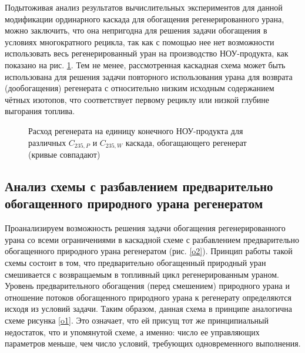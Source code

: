 Подытоживая анализ результатов вычислительных экспериментов для данной модификации ординарного каскада для обогащения регенерированного урана, можно заключить, что она непригодна для решения задачи обогащения в условиях многократного рецикла, так как с помощью нее нет возможности использовать весь регенерированный уран на производство НОУ-продукта, как показано на рис. \ref{Figure_10}. Тем не менее, рассмотренная каскадная схема может быть использована для решения задачи повторного использования урана для возврата (дообогащения) регенерата с относительно низким исходным содержанием чётных изотопов, что соответствует первому рециклу или низкой глубине выгорания топлива.


\begin{figure}[ht]
  \caption{Расход регенерата на единицу конечного НОУ-продукта для различных  $C_{235, P}$ и $C_{235, W}$ каскада, обогащающего регенерат (кривые совпадают)}\label{Figure_10}
\end{figure}

\subsection{Анализ схемы с разбавлением предварительно обогащенного природного урана регенератом}

Проанализируем возможность решения задачи обогащения регенерированного урана со всеми ограничениями в каскадной схеме с разбавлением предварительно обогащенного природного урана регенератом (рис. \ref{o2}). Принцип работы такой схемы состоит в том, что предварительно обогащенный природный уран смешивается с возвращаемым в топливный цикл регенерированным ураном. Уровень предварительного обогащения (перед смешением) природного урана и отношение потоков обогащенного природного урана к регенерату определяются исходя из условий задачи. Таким образом, данная схема в принципе аналогична схеме рисунка \ref{o1}. Это означает, что ей присущ тот же принципиальный недостаток, что и упомянутой схеме, а именно: число ее управляющих параметров меньше, чем число условий, требующих одновременного выполнения. 

